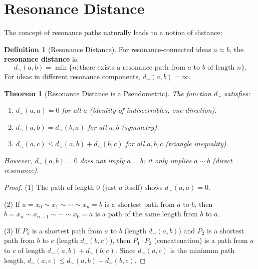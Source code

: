 \documentclass[11pt,openany]{book}
\theoremstyle{definition}
\newtheorem{definition}[axiom]{Definition}
\theoremstyle{plain}
\newtheorem{theorem}[axiom]{Theorem}
\theoremstyle{remark}
\newcommand{\res}{\sim}                      %
\begin{document}
\section{Resonance Distance}

The concept of resonance paths naturally leads to a notion of distance:

\begin{definition}[Resonance Distance]
For resonance-connected ideas $a \approx b$, the \textbf{resonance distance} is:
\[
d_{\res}(a, b) = \min\{n : \text{there exists a resonance path from } a \text{ to } b \text{ of length } n\}.
\]
For ideas in different resonance components, $d_{\res}(a, b) = \infty$.
\end{definition}

\begin{theorem}[Resonance Distance is a Pseudometric]
The function $d_{\res}$ satisfies:
\begin{enumerate}
\item $d_{\res}(a, a) = 0$ for all $a$ (identity of indiscernibles, one direction).
\item $d_{\res}(a, b) = d_{\res}(b, a)$ for all $a, b$ (symmetry).
\item $d_{\res}(a, c) \leq d_{\res}(a, b) + d_{\res}(b, c)$ for all $a, b, c$ (triangle inequality).
\end{enumerate}
However, $d_{\res}(a, b) = 0$ does \emph{not} imply $a = b$: it only implies $a \res b$ (direct resonance).
\end{theorem}

\begin{proof}
(1) The path of length 0 (just $a$ itself) shows $d_{\res}(a, a) = 0$.

(2) If $a = x_0 \res x_1 \res \cdots \res x_n = b$ is a shortest path from $a$ to $b$, then $b = x_n \res x_{n-1} \res \cdots \res x_0 = a$ is a path of the same length from $b$ to $a$.

(3) If $P_1$ is a shortest path from $a$ to $b$ (length $d_{\res}(a,b)$) and $P_2$ is a shortest path from $b$ to $c$ (length $d_{\res}(b,c)$), then $P_1 \cdot P_2$ (concatenation) is a path from $a$ to $c$ of length $d_{\res}(a,b) + d_{\res}(b,c)$. Since $d_{\res}(a,c)$ is the minimum path length, $d_{\res}(a,c) \leq d_{\res}(a,b) + d_{\res}(b,c)$.
\end{proof}
\end{document}
